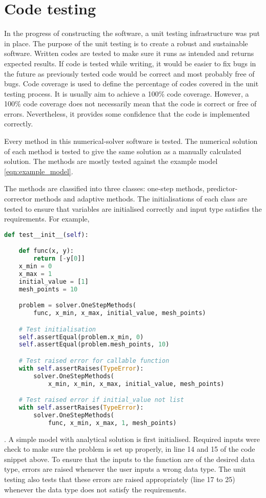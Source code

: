 \chapter{Code testing}
\label{chap:code-testing}
In the progress of constructing the software, a unit testing infrastructure was put in place. The purpose of the unit testing is to create a robust and sustainable software. Written codes are tested to make sure it runs as intended and returns expected results. If code is tested while writing, it would be easier to fix bugs in the future as previously tested code would be correct and most probably free of bugs. Code coverage is used to define the percentage of codes covered in the unit testing process. It is usually aim to achieve a 100\% code coverage. However, a 100\% code coverage does not necessarily mean that the code is correct or free of errors. Nevertheless, it provides some confidence that the code is implemented correctly.

Every method in this numerical-solver software is tested. The numerical solution of each method is tested to give the same solution as a manually calculated solution. The methods are mostly tested against the example model \ref{eqn:example_model}.

The methods are classified into three classes: one-step methods, predictor-corrector methods and adaptive methods. The initialisations of each class are tested to ensure that variables are initialised correctly and input type satisfies the requirements. For example, 

\begin{lstlisting}[language=Python]
def test__init__(self):

    def func(x, y):
        return [-y[0]]
    x_min = 0
    x_max = 1
    initial_value = [1]
    mesh_points = 10

    problem = solver.OneStepMethods(
        func, x_min, x_max, initial_value, mesh_points)

    # Test initialisation
    self.assertEqual(problem.x_min, 0)
    self.assertEqual(problem.mesh_points, 10)

    # Test raised error for callable function
    with self.assertRaises(TypeError):
        solver.OneStepMethods(
            x_min, x_min, x_max, initial_value, mesh_points)

    # Test raised error if initial_value not list
    with self.assertRaises(TypeError):
        solver.OneStepMethods(
            func, x_min, x_max, 1, mesh_points)
\end{lstlisting}
. A simple model with analytical solution is first initialised. Required inputs were check to make sure the problem is set up properly, in line 14 and 15 of the code snippet above. To ensure that the inputs to the function are of the desired data type, errors are raised whenever the user inputs a wrong data type. The unit testing also tests that these errors are raised appropriately (line 17 to 25) whenever the data type does not satisfy the requirements. 

